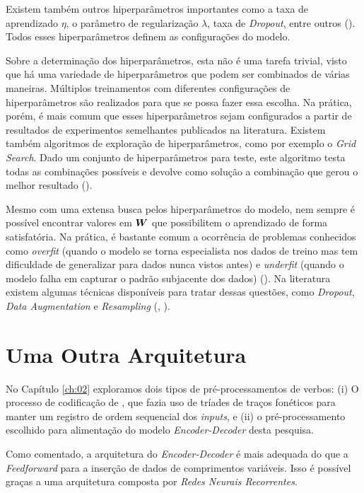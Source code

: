 Existem também outros hiperparâmetros importantes como a taxa de aprendizado $\eta$, o parâmetro de regularização $\lambda$, taxa de \textit{Dropout}, entre outros (\cite{josh:2017}). Todos esses hiperparâmetros definem as configurações do modelo.

Sobre a determinação dos hiperparâmetros, esta não é uma tarefa trivial, visto que há uma variedade de hiperparâmetros que podem ser combinados de várias maneiras. Múltiplos treinamentos com diferentes configurações de hiperparâmetros são realizados para que se possa fazer essa escolha. Na prática, porém, é mais comum que esses hiperparâmetros sejam configurados a partir de resultados de experimentos semelhantes publicados na literatura. Existem também algoritmos de exploração de hiperparâmetros, como por exemplo o \textit{Grid Search}. Dado um conjunto de hiperparâmetros para teste, este algoritmo testa todas as combinações possíveis e devolve como solução a combinação que gerou o melhor resultado (\cite{Goodfellow-et-al-2016}).

Mesmo com uma extensa busca pelos hiperparâmetros do modelo, nem sempre é possível encontrar valores em $\bm{W}$ que possibilitem o aprendizado de forma satisfatória. Na prática, é bastante comum a ocorrência de problemas conhecidos como \textit{overfit} (quando o modelo se torna especialista nos dados de treino mas tem dificuldade de generalizar para dados nunca vistos antes) e \textit{underfit} (quando o modelo falha em capturar o padrão subjacente dos dados) (\cite{josh:2017}). Na literatura existem algumas técnicas disponíveis para tratar dessas questões, como \textit{Dropout}, \textit{Data Augmentation} e \textit{Resampling} (\cite{Goodfellow-et-al-2016}, \cite{josh:2017}).  %

\section{Uma Outra Arquitetura}
\label{sec:arqFDD}

No Capítulo \ref{ch:02} exploramos dois tipos de pré-processamentos de verbos: (i) O processo de codificação de \cite{rumelhart:1986}, que fazia uso de tríades de traços fonéticos para manter um registro de ordem sequencial dos \textit{inputs}, e (ii) o pré-processamento escolhido para alimentação do modelo \textit{Encoder-Decoder} desta pesquisa.

Como comentado, a arquitetura do \textit{Encoder-Decoder} é mais adequada do que a \textit{Feedforward} para a inserção de dados de comprimentos variáveis. Isso é possível graças a uma arquitetura composta por \textit{Redes Neurais Recorrentes}.

